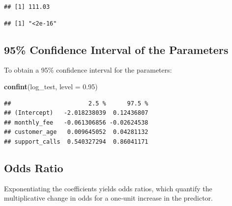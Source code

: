 \documentclass[
]{article}
\newenvironment{Shaded}{\begin{snugshade}}{\end{snugshade}}
\newcommand{\AttributeTok}[1]{\textcolor[rgb]{0.13,0.29,0.53}{#1}}
\newcommand{\CommentTok}[1]{\textcolor[rgb]{0.56,0.35,0.01}{\textit{#1}}}
\newcommand{\DecValTok}[1]{\textcolor[rgb]{0.00,0.00,0.81}{#1}}
\newcommand{\FloatTok}[1]{\textcolor[rgb]{0.00,0.00,0.81}{#1}}
\newcommand{\FunctionTok}[1]{\textcolor[rgb]{0.13,0.29,0.53}{\textbf{#1}}}
\newcommand{\NormalTok}[1]{#1}
\newcommand{\OtherTok}[1]{\textcolor[rgb]{0.56,0.35,0.01}{#1}}
\newcommand{\SpecialCharTok}[1]{\textcolor[rgb]{0.81,0.36,0.00}{\textbf{#1}}}
\begin{document}
\begin{verbatim}
## [1] 111.03
\end{verbatim}

\begin{Shaded}
\end{Shaded}

\begin{verbatim}
## [1] "<2e-16"
\end{verbatim}

\subsection{95\% Confidence Interval of the
Parameters}\label{confidence-interval-of-the-parameters}

To obtain a 95\% confidence interval for the parameters:

\begin{Shaded}
\begin{Highlighting}[]
\FunctionTok{confint}\NormalTok{(log\_test, }\AttributeTok{level =} \FloatTok{0.95}\NormalTok{)}
\end{Highlighting}
\end{Shaded}

\begin{verbatim}
##                      2.5 %      97.5 %
## (Intercept)   -2.018238039  0.12436807
## monthly_fee   -0.061306856 -0.02624538
## customer_age   0.009645052  0.04281132
## support_calls  0.540327294  0.86041171
\end{verbatim}

\subsection{Odds Ratio}\label{odds-ratio}

Exponentiating the coefficients yields odds ratios, which quantify the
multiplicative change in odds for a one‑unit increase in the predictor.
\end{document}
